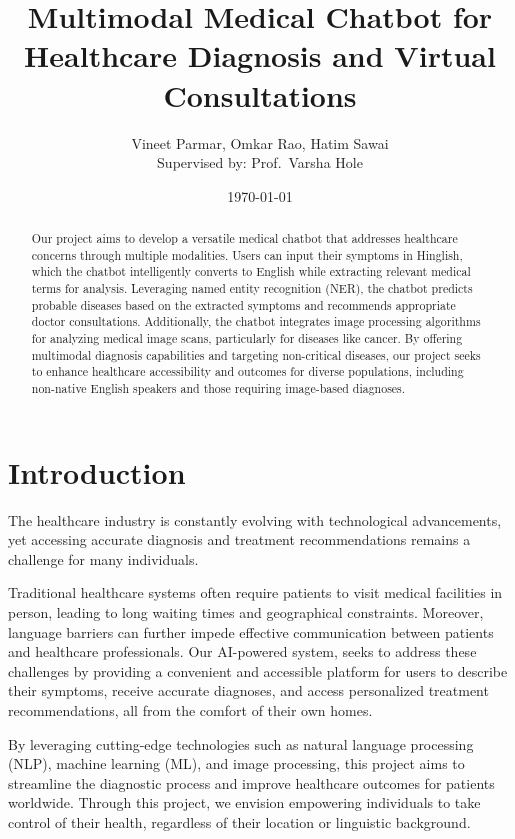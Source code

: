 \documentclass[onecolumn]{article}
\title{Multimodal Medical Chatbot for Healthcare Diagnosis and Virtual Consultations}
\author{Vineet Parmar, Omkar Rao, Hatim Sawai\\Supervised by: Prof.\ Varsha Hole}
\date{\today}
\begin{document}
\maketitle

\begin{abstract}
    Our project aims to develop a versatile medical chatbot that addresses healthcare concerns through multiple modalities. Users can input their symptoms in Hinglish, which the chatbot intelligently converts to English while extracting relevant medical terms for analysis. Leveraging named entity recognition (NER), the chatbot predicts probable diseases based on the extracted symptoms and recommends appropriate doctor consultations. Additionally, the chatbot integrates image processing algorithms for analyzing medical image scans, particularly for diseases like cancer. By offering multimodal diagnosis capabilities and targeting non-critical diseases, our project seeks to enhance healthcare accessibility and outcomes for diverse populations, including non-native English speakers and those requiring image-based diagnoses.
\end{abstract}

\section{Introduction}
The healthcare industry is constantly evolving with technological advancements, yet accessing accurate diagnosis and treatment recommendations remains a challenge for many individuals.

Traditional healthcare systems often require patients to visit medical facilities in person, leading to long waiting times and geographical constraints. Moreover, language barriers can further impede effective communication between patients and healthcare professionals. Our AI-powered system, seeks to address these challenges by providing a convenient and accessible platform for users to describe their symptoms, receive accurate diagnoses, and access personalized treatment recommendations, all from the comfort of their own homes.

By leveraging cutting-edge technologies such as natural language processing (NLP), machine learning (ML), and image processing, this project aims to streamline the diagnostic process and improve healthcare outcomes for patients worldwide. Through this project, we envision empowering individuals to take control of their health, regardless of their location or linguistic background.
\end{document}
